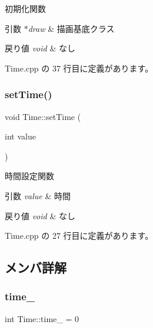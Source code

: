 初期化関数 


\begin{DoxyParams}{引数}
{\em $\ast$draw} & 描画基底クラス \\
\hline
\end{DoxyParams}

\begin{DoxyRetVals}{戻り値}
{\em void} & なし \\
\hline
\end{DoxyRetVals}


 Time.\+cpp の 37 行目に定義があります。

\mbox{\label{class_time_a3bcf296f050fbc5e22b6500a2b11f034}} 
\subsubsection{\texorpdfstring{set\+Time()}{setTime()}}
{\footnotesize\ttfamily void Time\+::set\+Time (\begin{DoxyParamCaption}\item[{int}]{value }\end{DoxyParamCaption})}



時間設定関数 


\begin{DoxyParams}{引数}
{\em value} & 時間 \\
\hline
\end{DoxyParams}

\begin{DoxyRetVals}{戻り値}
{\em void} & なし \\
\hline
\end{DoxyRetVals}


 Time.\+cpp の 27 行目に定義があります。



\subsection{メンバ詳解}
\mbox{\label{class_time_aa857ba9a5de02d7fe3fb863719f88159}} 
\subsubsection{\texorpdfstring{time\+\_\+}{time\_}}
{\footnotesize\ttfamily int Time\+::time\+\_\+ = 0\hspace{0.3cm}{\ttfamily [private]}}




